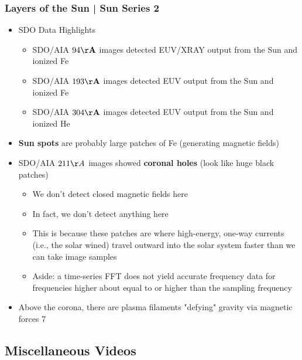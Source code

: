 \documentclass[a4paper]{article}
\begin{document}
	\subsubsection*{Layers of the Sun | Sun Series 2}
			\begin{itemize}
				\item SDO Data Highlights 
				\begin{itemize}
					\item SDO/AIA $94 \mathbf{\AA}$ images detected EUV/XRAY output from the Sun and ionized Fe
					\item SDO/AIA $193 \mathbf{\AA}$ images detected EUV output from the Sun and ionized Fe
					\item SDO/AIA $304 \mathbf{\AA}$ images detected EUV output from the Sun and ionized He 
				\end{itemize}
				\item \textbf{Sun spots} are probably large patches of Fe (generating magnetic fields)
				\item SDO/AIA $211 \AA$ images showed \textbf{coronal holes} (look like huge black patches)				
				\begin{itemize}
					\item We don't detect closed magnetic fields here
					\item In fact, we don't detect anything here
					\item This is because these patches are where high-energy, one-way currents (i.e., the solar wined)  travel outward into the solar system faster than we can take image samples
					\item Aside: a time-series FFT does not yield accurate frequency data for frequencies higher about equal to or higher than the sampling frequency 
				\end{itemize}
				\item Above the corona, there are plasma filaments "defying" gravity via magnetic forces 7
			\end{itemize}			
	\subsection*{Miscellaneous Videos}
\end{document}
